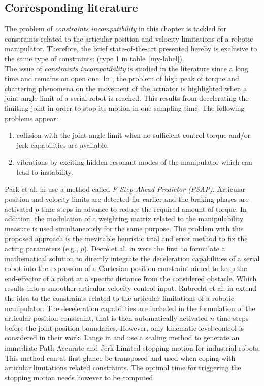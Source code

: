 \subsection{Corresponding literature}
\label{subsec:crspnd_litt}
The problem of \textit{constraints incompatibility} in this chapter is tackled for constraints related to the articular position and velocity limitations of a robotic manipulator. Therefore, the brief state-of-the-art presented hereby is exclusive to the same type of constraints: (type 1 in table~\ref{my-label}). \\
The issue of \textit{constraints incompatibility} is studied in the literature since a long time and remains an open one. In \cite{park1998enhanced}, the problem of high peak of torque and chattering phenomena on the movement of the actuator is highlighted when a joint angle limit of a serial robot is reached. This results from decelerating the limiting joint in order to stop its motion in one sampling time. The following problems appear:
\begin{enumerate}
\item collision with the joint angle limit when no sufficient control torque and/or jerk capabilities are available.
\item vibrations by exciting hidden resonant modes of the manipulator which can lead to instability.
\end{enumerate}
Park et al. in \cite{park1998enhanced} use a method called \textit{P-Step-Ahead Predictor (PSAP)}. Articular position and velocity limits are  detected far earlier and the braking phases are activated $p$ time-steps in advance to reduce the required amount of torque. In addition, the modulation of a weighting matrix related to the manipulability measure \cite{yoshikawa1985manipulability} is used simultaneously for the same purpose. The problem with this proposed approach is the inevitable heuristic trial and error method to fix the acting parameters (e.g., $p$). Decr\'e et al. in \cite{decre2009extending} were the first to  formulate a mathematical solution to directly integrate the deceleration capabilities of a serial robot into the expression of a Cartesian position constraint aimed to keep the end-effector of a robot at a specific distance from the considered obstacle. Which results into a smoother articular velocity control input. Rubrecht et al. in \cite{rubrecht2010constraints} extend the idea to the constraints related to the articular limitations of a robotic manipulator. The deceleration capabilities are included in the formulation of the articular position constraint, that is then automatically activated $n$ time-steps before the joint position boundaries. However, only kinematic-level control is considered in their work. Lange in \cite{lange2014predictive} and  \cite{lange2015trajectory} use a scaling method to generate an immediate Path-Accurate and Jerk-Limited stopping motion for industrial robots. This method can at first glance be transposed and used when coping with articular limitations related constraints. The optimal time for triggering the stopping motion needs however to be computed.  \\

